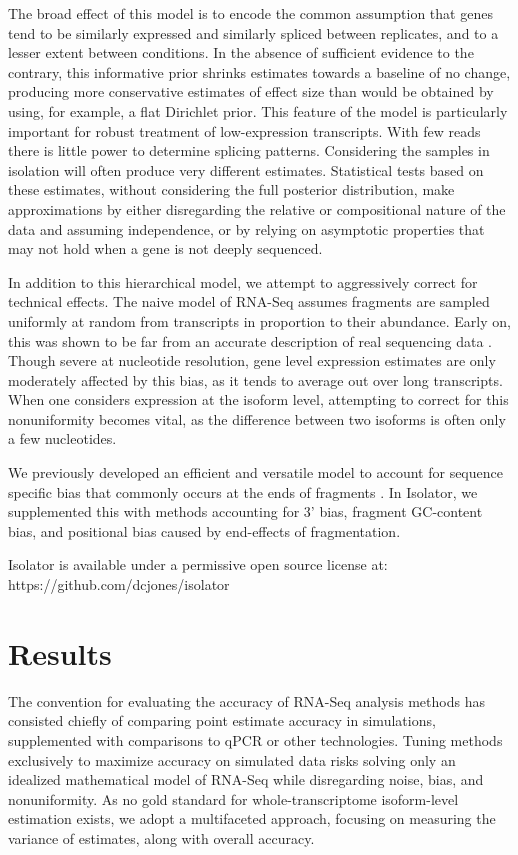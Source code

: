 \documentclass[twocolumn]{article}
\begin{document}
The broad effect of this model is to encode the common assumption that
genes tend to be similarly expressed and similarly spliced between
replicates, and to a lesser extent between conditions. In the absence of
sufficient evidence to the contrary, this informative prior shrinks
estimates towards a baseline of no change, producing more conservative
estimates of effect size than would be obtained by using, for example, a
flat Dirichlet prior. This feature of the model is particularly
important for robust treatment of low-expression transcripts. With few reads
there is little power to determine splicing patterns. Considering the
samples in isolation will often produce very different estimates.
Statistical tests based on these estimates, without considering the full
posterior distribution, make approximations by either
disregarding the relative or compositional nature of the data and
assuming independence, or by relying on asymptotic properties that may
not hold when a gene is not deeply sequenced.

In addition to this hierarchical model, we attempt to aggressively correct for
technical effects. The naive model of RNA-Seq assumes fragments are sampled
uniformly at random from transcripts in proportion to their abundance. Early on,
this was shown to be far from an accurate description of real sequencing data
\cite{Hansen:2010if}. Though severe at nucleotide resolution, gene level
expression estimates are only moderately affected by this bias, as it tends to
average out over long transcripts. When one considers expression at the isoform
level, attempting to correct for this nonuniformity becomes vital, as the
difference between two isoforms is often only a few nucleotides.

We previously developed an efficient and versatile model to account for sequence
specific bias that commonly occurs at the ends of fragments \cite{Jones:2012hg}.
In Isolator, we supplemented this with methods accounting for 3' bias, fragment
GC-content bias, and positional bias caused by end-effects of fragmentation.

Isolator is available under a permissive open source license at:
https://github.com/dcjones/isolator

\section{Results}\label{results}

The convention for evaluating the accuracy of RNA-Seq analysis methods has
consisted chiefly of comparing point estimate accuracy in simulations,
supplemented with comparisons to qPCR or other technologies. Tuning methods
exclusively to maximize accuracy on simulated data risks solving only an
idealized mathematical model of RNA-Seq while disregarding noise, bias, and
nonuniformity. As no gold standard for whole-transcriptome isoform-level
estimation exists, we adopt a multifaceted approach, focusing on measuring
the variance of estimates, along with overall accuracy.
\end{document}
